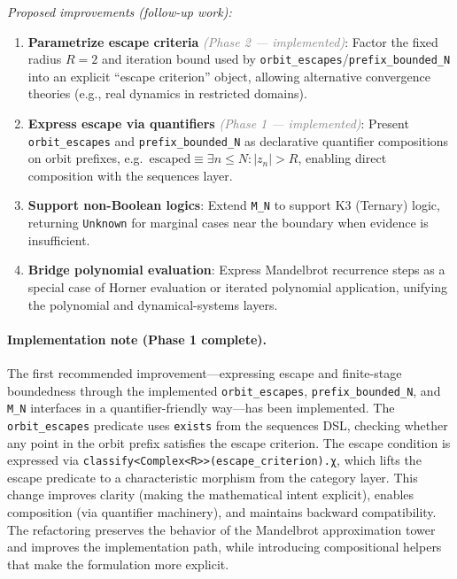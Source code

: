 \documentclass[11pt, a4paper]{report}
\begin{document}
\textit{Proposed improvements (follow-up work):}
\begin{enumerate}
  \item \textbf{Parametrize escape criteria} \textcolor{gray}{\textit{(Phase 2 --- implemented)}}: Factor the fixed radius $R = 2$ and iteration bound used by \texttt{orbit\_escapes}/\texttt{prefix\_bounded\_N} into an explicit ``escape criterion'' object, allowing alternative convergence theories (e.g., real dynamics in restricted domains).
  \item \textbf{Express escape via quantifiers} \textcolor{gray}{\textit{(Phase 1 --- implemented)}}: Present \texttt{orbit\_escapes} and \texttt{prefix\_bounded\_N} as declarative quantifier compositions on orbit prefixes, e.g.\ $\text{escaped} \equiv \exists n \le N : |z_n| > R$, enabling direct composition with the sequences layer.
  \item \textbf{Support non-Boolean logics}: Extend \texttt{M\_N} to support K3 (Ternary) logic, returning \texttt{Unknown} for marginal cases near the boundary when evidence is insufficient.
  \item \textbf{Bridge polynomial evaluation}: Express Mandelbrot recurrence steps as a special case of Horner evaluation or iterated polynomial application, unifying the polynomial and dynamical-systems layers.
\end{enumerate}

\paragraph{Implementation note (Phase 1 complete).}
The first recommended improvement—expressing escape and finite-stage boundedness through the implemented \texttt{orbit\_escapes}, \texttt{prefix\_bounded\_N}, and \texttt{M\_N} interfaces in a quantifier-friendly way—has been implemented.
The \texttt{orbit\_escapes} predicate uses \texttt{exists} from the sequences DSL, checking whether any point in the orbit prefix satisfies the escape criterion.
The escape condition is expressed via \texttt{classify<Complex<R>>(escape\_criterion).χ}, which lifts the escape predicate to a characteristic morphism from the category layer.
This change improves clarity (making the mathematical intent explicit), enables composition (via quantifier machinery), and maintains backward compatibility.
The refactoring preserves the behavior of the Mandelbrot approximation tower and improves the implementation path, while introducing compositional helpers that make the formulation more explicit.
\end{document}
